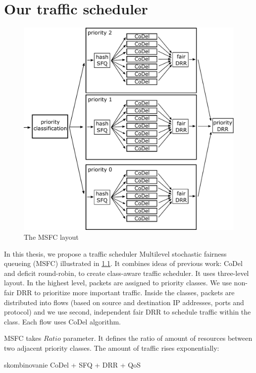 \chapter{Our traffic scheduler}
\label{chap02}

\begin{figure}
	\centering
	\includegraphics[width=137mm]{drawings/msfc}
	\caption{The MSFC layout}
	\label{fig10:msfc}
\end{figure}

In this thesis, we propose a traffic scheduler Multilevel stochastic fairness queueing (MSFC) illustrated in \ref{fig10:msfc}. It combines ideas of previous work: CoDel and deficit round-robin, to create class-aware traffic scheduler. It uses three-level layout. In the highest level, packets are assigned to priority classes. We use non-fair DRR to prioritize more important traffic. Inside the classes, packets are distributed into flows (based on source and destination IP addresses, ports and protocol) and we use second, independent fair DRR to schedule traffic within the class. Each flow uses CoDel algorithm.

MSFC takes $Ratio$ parameter. It defines the ratio of amount of resources between two adjacent priority classes. The amount of traffic rises exponentially: 


skombinovanie CoDel + SFQ + DRR + QoS


